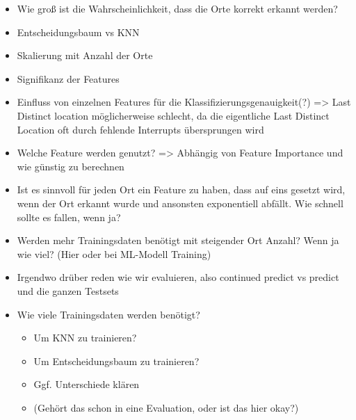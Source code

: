 \begin{itemize}
    \item Wie groß ist die Wahrscheinlichkeit, dass die Orte korrekt erkannt werden?
    \item Entscheidungsbaum vs KNN
    \item Skalierung mit Anzahl der Orte
    \item Signifikanz der Features
    \item Einfluss von einzelnen Features für die Klassifizierungsgenauigkeit(?) => Last Distinct location möglicherweise schlecht, da die eigentliche Last Distinct Location oft durch fehlende Interrupts übersprungen wird
    \item Welche Feature werden genutzt? => Abhängig von Feature Importance und wie günstig zu berechnen
    \item Ist es sinnvoll für jeden Ort ein Feature zu haben, dass auf eins gesetzt wird, wenn der Ort erkannt wurde und ansonsten exponentiell abfällt. Wie schnell sollte es fallen, wenn ja?
    \item Werden mehr Trainingsdaten benötigt mit steigender Ort Anzahl? Wenn ja wie viel? (Hier oder bei ML-Modell Training)
    \item Irgendwo drüber reden wie wir evaluieren, also continued predict vs predict und die ganzen Testsets
    \item Wie viele Trainingsdaten werden benötigt?
    \begin{itemize}
        \item Um KNN zu trainieren?
        \item Um Entscheidungsbaum zu trainieren?
        \item Ggf. Unterschiede klären
        \item (Gehört das schon in eine Evaluation, oder ist das hier okay?)
    \end{itemize}
\end{itemize}